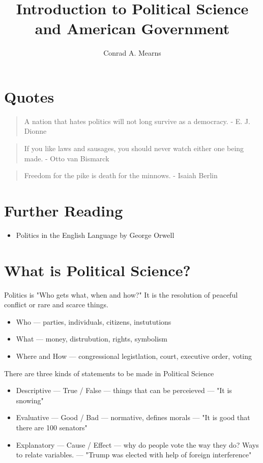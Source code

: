 \documentclass{article}
\title{Introduction to Political Science and American Government}
\author{Conrad A. Mearns}
\begin{document}
\maketitle

\section{Quotes}
\begin{quote}
  A nation that hates politics will not long survive as a democracy. - E. J. Dionne
\end{quote}
\begin{quote}
  If you like laws and sausages, you should never watch either one being made. - Otto van Bismarck
\end{quote}
\begin{quote}
  Freedom for the pike is death for the minnows. - Isaiah Berlin
\end{quote}

\section{Further Reading}
\begin{itemize}
  \item Politics in the English Language by George Orwell
\end{itemize}

\section{What is Political Science?}
Politics is "Who gets what, when and how?" It is the resolution of peaceful conflict or rare and scarce things.
\begin{itemize}
  \item Who --- parties, individuals, citizens, instututions
  \item What --- money, distrubution, rights, symbolism
  \item Where and How --- congressional legistlation, court, executive order, voting
\end{itemize}

There are three kinds of statements to be made in Political Science
\begin{itemize}
  \item Descriptive --- True / False --- things that can be perceieved --- "It is snowing"
  \item Evaluative --- Good / Bad --- normative, defines morals --- "It is good that there are 100 senators"
  \item Explanatory --- Cause / Effect --- why do people vote the way they do? Ways to relate variables. --- "Trump was elected with help of foreign interference"
\end{itemize}
\end{document}
